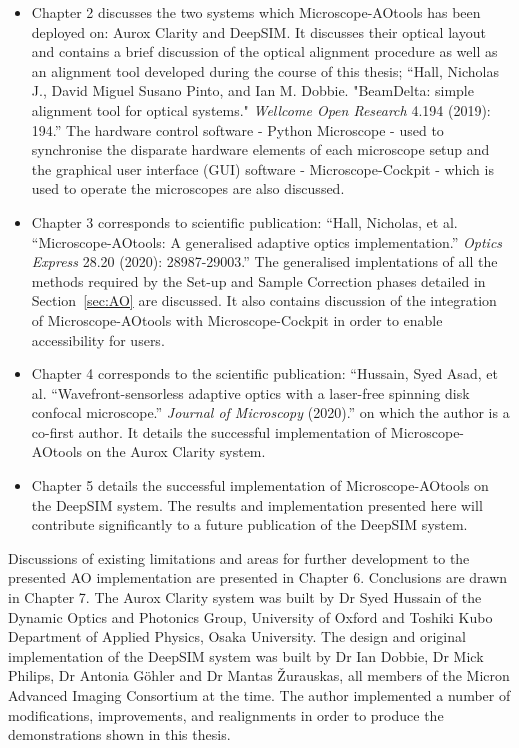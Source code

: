 \begin{itemize}
	\item Chapter 2 discusses the two systems which Microscope-AOtools has
	been deployed on: Aurox Clarity and DeepSIM. It discusses their optical 
	layout and contains a brief discussion of the optical alignment 
	procedure as well as an alignment tool developed during the course of 
	this thesis; ``Hall, Nicholas J., David Miguel Susano Pinto, and Ian M. 
	Dobbie. "BeamDelta: simple alignment tool for optical systems." 
	\textit{Wellcome Open Research} 4.194 (2019): 194.''\cite{dobbie2019beamdelta} 
	The hardware control software - Python Microscope - used to synchronise 
	the disparate hardware elements of each microscope setup and the 
	graphical user interface (GUI) software - Microscope-Cockpit - which 
	is used to operate the microscopes are also discussed.
	\item Chapter 3 corresponds to scientific publication: ``Hall, Nicholas, 
	et al. ``Microscope-AOtools: A generalised adaptive optics 
	implementation.''
	\textit{Optics Express} 28.20 (2020): 28987-29003.''\cite{hall2020microscope}
	The generalised implentations of all the methods required by the Set-up and 
	Sample Correction phases detailed in Section~\ref{sec:AO} are discussed.
	It also contains discussion of the integration of Microscope-AOtools with
	Microscope-Cockpit in order to enable accessibility for users.
	\item Chapter 4 corresponds to the scientific publication: ``Hussain, 
	Syed Asad, et al. ``Wavefront-sensorless adaptive optics with a 
	laser-free spinning disk confocal microscope.'' \textit{Journal of 
		Microscopy} (2020).'' 
	on which the author is a co-first author\cite{hussain2020wavefront}. It details the successful 
	implementation of Microscope-AOtools on the Aurox Clarity system.
	\item Chapter 5 details the successful implementation of Microscope-AOtools 
	on the DeepSIM system. The results and implementation presented here will
	contribute significantly to a future publication of the DeepSIM system.
\end{itemize}

Discussions of existing limitations and areas for further development to the 
presented AO implementation are presented in Chapter 6. Conclusions are drawn 
in Chapter 7. The Aurox Clarity system was built by Dr Syed Hussain of the 
Dynamic Optics and Photonics Group, University of Oxford and Toshiki Kubo
Department of Applied Physics, Osaka University. The design and original 
implementation of the DeepSIM system was built by Dr Ian Dobbie, Dr Mick 
Philips, Dr Antonia G\"{o}hler and Dr Mantas \v{Z}urauskas, 
all members of the Micron Advanced Imaging Consortium at the time. The author 
implemented a number of modifications, improvements, and realignments in 
order to produce the demonstrations shown in this thesis.
